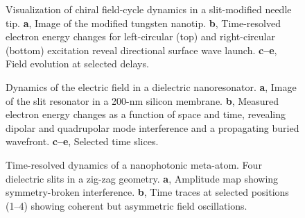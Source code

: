 \documentclass[12pt]{article}
\begin{document}
\begin{figure}[htbp]
    \centering
    \caption{Visualization of chiral field-cycle dynamics in a slit-modified needle tip. \textbf{a}, Image of the modified tungsten nanotip. \textbf{b}, Time-resolved electron energy changes for left-circular (top) and right-circular (bottom) excitation reveal directional surface wave launch. \textbf{c--e}, Field evolution at selected delays.}
    \label{fig:chiral}
\end{figure}

\begin{figure}[htbp]
    \centering
    \caption{Dynamics of the electric field in a dielectric nanoresonator. \textbf{a}, Image of the slit resonator in a 200-nm silicon membrane. \textbf{b}, Measured electron energy changes as a function of space and time, revealing dipolar and quadrupolar mode interference and a propagating buried wavefront. \textbf{c--e}, Selected time slices.}
    \label{fig:resonator}
\end{figure}

\begin{figure}[htbp]
    \centering
    \caption{Time-resolved dynamics of a nanophotonic meta-atom. Four dielectric slits in a zig-zag geometry. \textbf{a}, Amplitude map showing symmetry-broken interference. \textbf{b}, Time traces at selected positions (1--4) showing coherent but asymmetric field oscillations.}
    \label{fig:antenna}
\end{figure}


\end{document}
